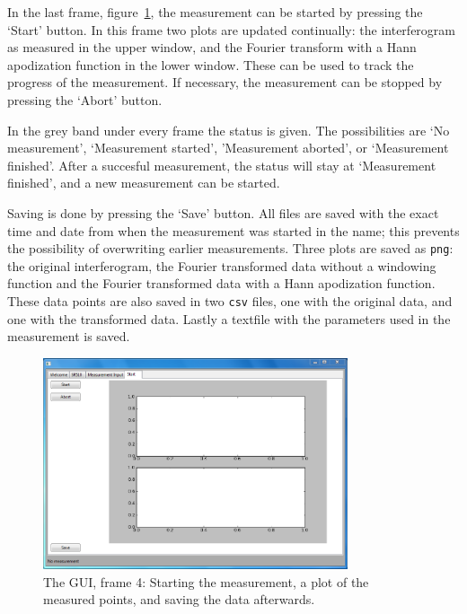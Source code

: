 In the last frame, figure~\ref{fig:gui4}, the measurement can be started by pressing the `Start' button. In this frame two plots are updated continually: the interferogram as measured in the upper window, and the Fourier transform with a Hann apodization function in the lower window. These can be used to track the progress of the measurement. If necessary, the measurement can be stopped by pressing the `Abort' button.

In the grey band under every frame the status is given. The possibilities are `No measurement', `Measurement started', 'Measurement aborted', or `Measurement finished'. After a succesful measurement, the status will stay at `Measurement finished', and a new measurement can be started.

Saving is done by pressing the `Save' button. All files are saved with the exact time and date from when the measurement was started in the name; this prevents the possibility of overwriting earlier measurements. Three plots are saved as \verb!png!: the original interferogram, the Fourier transformed data without a windowing function and the Fourier transformed data with a Hann apodization function. These data points are also saved in two \verb!csv! files, one with the original data, and one with the transformed data. Lastly a textfile with the parameters used in the measurement is saved.

\begin{figure}[!ht]
 \begin{center}
  \includegraphics[width=0.8\textwidth]{figures/gui4}
  \caption{The GUI, frame 4: Starting the measurement, a plot of the measured points, and saving the data afterwards.}
  \label{fig:gui4}
 \end{center}
\end{figure}
